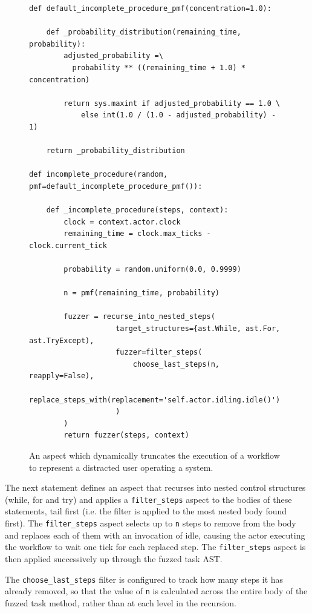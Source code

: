 \documentclass{llncs}
\begin{document}
\begin{figure}
  \centering
\begin{lstlisting}
def default_incomplete_procedure_pmf(concentration=1.0):

    def _probability_distribution(remaining_time, probability):
        adjusted_probability =\
          probability ** ((remaining_time + 1.0) * concentration)

        return sys.maxint if adjusted_probability == 1.0 \
            else int(1.0 / (1.0 - adjusted_probability) - 1)

    return _probability_distribution

def incomplete_procedure(random, pmf=default_incomplete_procedure_pmf()):

    def _incomplete_procedure(steps, context):
        clock = context.actor.clock
        remaining_time = clock.max_ticks - clock.current_tick

        probability = random.uniform(0.0, 0.9999)

        n = pmf(remaining_time, probability)

        fuzzer = recurse_into_nested_steps(
                    target_structures={ast.While, ast.For, ast.TryExcept),
                    fuzzer=filter_steps(
                        choose_last_steps(n, reapply=False),
                        replace_steps_with(replacement='self.actor.idling.idle()')
                    )
        )
        return fuzzer(steps, context)
\end{lstlisting}
  \caption{An aspect which dynamically truncates the execution of a workflow to represent a distracted user operating a
    system.}
  \label{fig:distraction-fuzzer}
\end{figure}


The next statement defines an aspect that recurses into nested control structures (while, for and try) and applies a
\lstinline!filter_steps! aspect to the bodies of these statements, tail first (i.e. the filter is applied to the most
nested body found first).  The \lstinline!filter_steps! aspect selects up to \lstinline!n! steps to remove from the body
and replaces each of them with an invocation of idle, causing the actor executing the workflow to wait one tick for each
replaced step.  The \lstinline!filter_steps! aspect is then applied successively up through the fuzzed task AST.

The \lstinline!choose_last_steps! filter is configured to track how many steps it has already removed, so that the value
of \lstinline!n! is calculated across the entire body of the fuzzed task method, rather than at each level in the
recursion.
 
\end{document}
